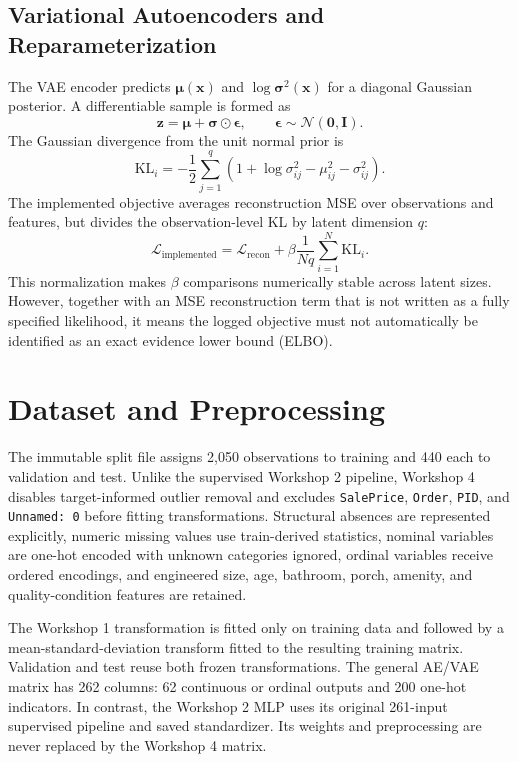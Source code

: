 \documentclass[11pt,letterpaper]{article}
\begin{document}
\subsection{Variational Autoencoders and Reparameterization}
The VAE encoder predicts $\boldsymbol{\mu}(\mathbf{x})$ and $\log\boldsymbol{\sigma}^2(\mathbf{x})$ for a diagonal Gaussian posterior. A differentiable sample is formed as
\begin{equation}
\mathbf{z}=\boldsymbol{\mu}+\boldsymbol{\sigma}\odot\boldsymbol{\epsilon},
\qquad \boldsymbol{\epsilon}\sim\mathcal{N}(\mathbf{0},\mathbf{I}).
\label{eq:reparam}
\end{equation}
The Gaussian divergence from the unit normal prior is
\begin{equation}
\mathrm{KL}_i=-\frac{1}{2}\sum_{j=1}^{q}\left(1+\log\sigma_{ij}^{2}-\mu_{ij}^{2}-\sigma_{ij}^{2}\right).
\label{eq:kl}
\end{equation}
The implemented objective averages reconstruction MSE over observations and features, but divides the observation-level KL by latent dimension $q$:
\begin{equation}
\mathcal{L}_{\mathrm{implemented}}=\mathcal{L}_{\mathrm{recon}}+\beta\frac{1}{Nq}\sum_{i=1}^{N}\mathrm{KL}_i.
\label{eq:vae}
\end{equation}
This normalization makes $\beta$ comparisons numerically stable across latent sizes. However, together with an MSE reconstruction term that is not written as a fully specified likelihood, it means the logged objective must not automatically be identified as an exact evidence lower bound (ELBO).

\section{Dataset and Preprocessing}
The immutable split file assigns 2,050 observations to training and 440 each to validation and test. Unlike the supervised Workshop 2 pipeline, Workshop 4 disables target-informed outlier removal and excludes \texttt{SalePrice}, \texttt{Order}, \texttt{PID}, and \texttt{Unnamed: 0} before fitting transformations. Structural absences are represented explicitly, numeric missing values use train-derived statistics, nominal variables are one-hot encoded with unknown categories ignored, ordinal variables receive ordered encodings, and engineered size, age, bathroom, porch, amenity, and quality-condition features are retained.

The Workshop 1 transformation is fitted only on training data and followed by a mean-standard-deviation transform fitted to the resulting training matrix. Validation and test reuse both frozen transformations. The general AE/VAE matrix has 262 columns: 62 continuous or ordinal outputs and 200 one-hot indicators. In contrast, the Workshop 2 MLP uses its original 261-input supervised pipeline and saved standardizer. Its weights and preprocessing are never replaced by the Workshop 4 matrix.
\end{document}
